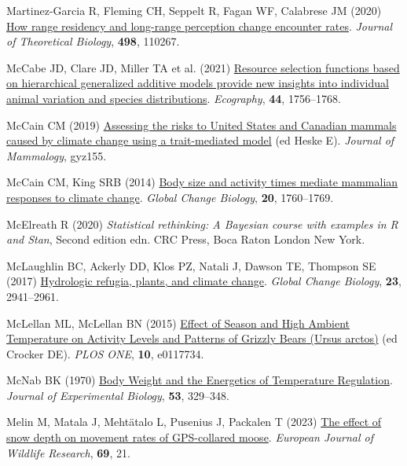\documentclass[
  12pt,
]{article}
\newlength{\cslhangindent}
\newenvironment{CSLReferences}[2] %
 {\begin{list}{}{%
  \setlength{\itemindent}{0pt}
  \setlength{\leftmargin}{0pt}
  \setlength{\parsep}{0pt}
  \ifodd #1
   \setlength{\leftmargin}{\cslhangindent}
   \setlength{\itemindent}{-1\cslhangindent}
  \fi
  \setlength{\itemsep}{#2\baselineskip}}}
 {\end{list}}
\begin{document}
\begin{CSLReferences}{1}{0}
Martinez-Garcia R, Fleming CH, Seppelt R, Fagan WF, Calabrese JM (2020) \href{https://doi.org/10.1016/j.jtbi.2020.110267}{How range residency and long-range perception change encounter rates}. \emph{Journal of Theoretical Biology}, \textbf{498}, 110267.

McCabe JD, Clare JD, Miller TA et al. (2021) \href{https://doi.org/10.1111/ecog.06058}{Resource selection functions based on hierarchical generalized additive models provide new insights into individual animal variation and species distributions}. \emph{Ecography}, \textbf{44}, 1756--1768.

McCain CM (2019) \href{https://doi.org/10.1093/jmammal/gyz155}{Assessing the risks to {United} {States} and {Canadian} mammals caused by climate change using a trait-mediated model} (ed Heske E). \emph{Journal of Mammalogy}, gyz155.

McCain CM, King SRB (2014) \href{https://doi.org/10.1111/gcb.12499}{Body size and activity times mediate mammalian responses to climate change}. \emph{Global Change Biology}, \textbf{20}, 1760--1769.

McElreath R (2020) \emph{\emph{Statistical rethinking: A {Bayesian} course with examples in {R} and {Stan}}}, Second edition edn. CRC Press, Boca Raton London New York.

McLaughlin BC, Ackerly DD, Klos PZ, Natali J, Dawson TE, Thompson SE (2017) \href{https://doi.org/10.1111/gcb.13629}{Hydrologic refugia, plants, and climate change}. \emph{Global Change Biology}, \textbf{23}, 2941--2961.

McLellan ML, McLellan BN (2015) \href{https://doi.org/10.1371/journal.pone.0117734}{Effect of {Season} and {High} {Ambient} {Temperature} on {Activity} {Levels} and {Patterns} of {Grizzly} {Bears} ({Ursus} arctos)} (ed Crocker DE). \emph{PLOS ONE}, \textbf{10}, e0117734.

McNab BK (1970) \href{https://doi.org/10.1242/jeb.53.2.329}{Body {Weight} and the {Energetics} of {Temperature} {Regulation}}. \emph{Journal of Experimental Biology}, \textbf{53}, 329--348.

Melin M, Matala J, Mehtätalo L, Pusenius J, Packalen T (2023) \href{https://doi.org/10.1007/s10344-023-01650-w}{The effect of snow depth on movement rates of {GPS}-collared moose}. \emph{European Journal of Wildlife Research}, \textbf{69}, 21.


\end{CSLReferences}
\end{document}
